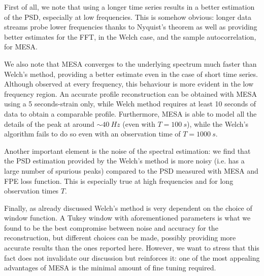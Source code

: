 \documentclass{aa}
\begin{document}
First of all, we note that using a longer time series results in a better estimation of the PSD, especially at low frequencies. 
This is somehow obvious: longer data streams probe lower frequencies thanks to Nyquist's theorem as well as providing better estimates for the FFT, in the Welch case, and the sample autocorrelation, for MESA.

We also note that MESA converges to the underlying spectrum much faster than Welch's method, providing a better estimate even in the case of short time series. Although observed at every frequency, this behaviour is more evident in the low frequency region. An accurate profile reconstruction can be obtained with MESA using a 5 seconds-strain only, while Welch method requires at least 10 seconds of data to obtain a comparable profile.
Furthermore, MESA is able to model all the details of the peak at around $\sim \SI{40}{Hz}$ (even with $T=\SI{100}{s}$), while the Welch's algorithm fails to do so even with an observation time of $T=\SI{1000}{s}$.

Another important element is the noise of the spectral estimation: we find that the PSD estimation provided by the Welch's method is more noisy (i.e. has a large number of spurious peaks) compared to the PSD measured with MESA and FPE loss function. This is especially true at high frequencies and for long observation times $T$.

Finally, as already discussed Welch's method is very dependent on the choice of window function. 
A Tukey window with aforementioned parameters is what we found to be the best compromise between noise 
and accuracy for the reconstruction, but different choices can be made, possibly providing more accurate results than the ones reported here. 
However, we want to stress that this fact does not invalidate our discussion but reinforces it: one of the most appealing advantages of MESA is the minimal amount of fine tuning required.
\end{document}
